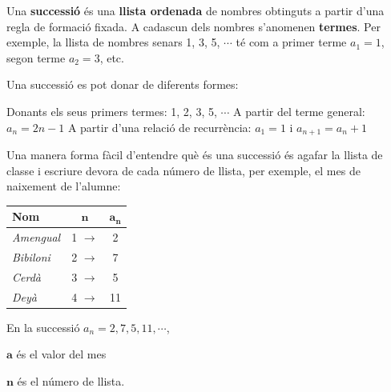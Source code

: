 \begin{theorybox}
 Una \textbf{successió} és una \textbf{llista ordenada} de nombres obtinguts a partir d'una regla de formació fixada. A cadascun dels nombres s'anomenen \textbf{termes}. Per exemple, la llista de nombres senars 1, 3, 5, $\cdots$ té com a primer terme $a_1 = 1$, segon terme $a_2=3$, etc.
 
 Una successió es pot donar de diferents formes:
 \begin{itemize}
 	\exer Donants els seus primers termes: 1, 2, 3, 5, $\cdots$
 	\exer A partir del terme general:  $a_n = 2n-1$
 	\exer A partir d'una relació de recurrència:  $a_1 = 1$ i $a_{n+1} = a_n + 1$
 \end{itemize}
\end{theorybox}
\vspace{-0.5cm}
\begin{blueshaded}
	Una manera forma fàcil d'entendre què és una successió és agafar la llista de classe i escriure devora de cada número de llista, per exemple, el mes de naixement de l'alumne:
	
	\begin{minipage}{0.5\textwidth}
	 	\begin{tabular}{lcc}
	 	\textbf{Nom} & $\mathbf{n}$ & $\mathbf{a_n}$ \\ \hline	
	 	\emph{Amengual} & 1 $\rightarrow$ & 2 \\
	 	\emph{Bibiloni} & 2 $\rightarrow$ & 7 \\
	 	\emph{Cerdà}    & 3 $\rightarrow$ & 5 \\
	 	\emph{Deyà}    & 4 $\rightarrow$ & 11
	 \end{tabular}
	\end{minipage}
	\begin{minipage}{0.5\textwidth}	
		En la successió $a_n= 2, 7, 5, 11, \cdots$,
		
		\qquad $\mathbf{a}$ és el valor del mes 
		 
		 \qquad $\mathbf{n}$ és el número de llista.
	\end{minipage}
\end{blueshaded}


